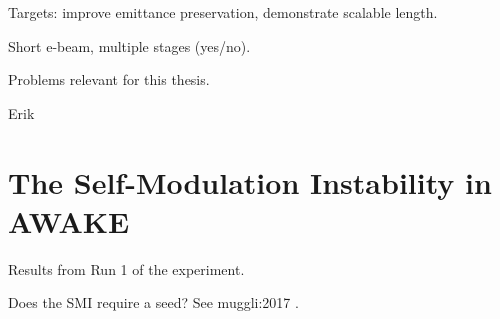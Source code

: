 Targets: improve emittance preservation, demonstrate scalable length.

Short e-beam, multiple stages (yes/no).

Problems relevant for this thesis.

Erik \cite{adli:2016a}

\section{The Self-Modulation Instability in AWAKE}
\label{WFA:SMI}

Results from Run 1 of the experiment.


Does the SMI require a seed? See muggli:2017 \cite{muggli:2017a}.

